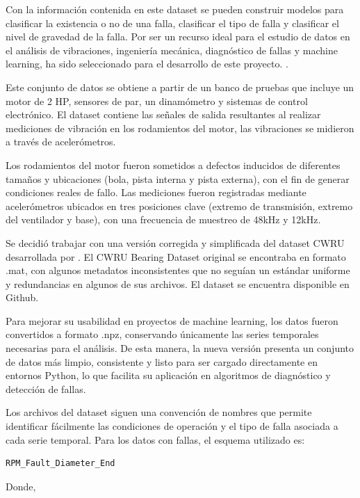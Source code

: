 \documentclass[11pt,a4paper,spanish]{book}
\numberwithin{equation}{chapter}
\numberwithin{figure}{chapter}
\begin{document}
Con la información contenida en este dataset se pueden construir modelos para clasificar la existencia o no de una falla, clasificar el tipo de falla y clasificar el nivel de gravedad de la falla. Por ser un recurso ideal para el estudio de datos en el análisis de vibraciones, ingeniería mecánica, diagnóstico de fallas y machine learning, ha sido seleccionado para el desarrollo de este proyecto. \cite{caseWesternBearingData}. 


Este conjunto de datos se obtiene a partir de un banco de pruebas que incluye un motor de 2 HP, sensores de par, un dinamómetro y sistemas de control electrónico. El dataset contiene las señales de salida resultantes al realizar mediciones de vibración en los rodamientos del motor, las vibraciones se midieron a través de acelerómetros.  


Los rodamientos del motor fueron sometidos a defectos inducidos de diferentes tamaños y ubicaciones (bola, pista interna y pista externa), con el fin de generar condiciones reales de fallo. Las mediciones fueron registradas mediante acelerómetros ubicados en tres posiciones clave (extremo de transmisión, extremo del ventilador y base), con una frecuencia de muestreo de 48kHz y 12kHz. 


Se decidió trabajar con una versión corregida y simplificada del dataset CWRU desarrollada por \cite{rigas2024marine}. El CWRU Bearing Dataset original se encontraba en formato .mat, con algunos metadatos inconsistentes que no seguían un estándar uniforme y redundancias en algunos de sus archivos. El dataset se encuentra disponible en Github. 


Para mejorar su usabilidad en proyectos de machine learning, los datos fueron convertidos a formato .npz, conservando únicamente las series temporales necesarias para el análisis. De esta manera, la nueva versión presenta un conjunto de datos más limpio, consistente y listo para ser cargado directamente en entornos Python, lo que facilita su aplicación en algoritmos de diagnóstico y detección de fallas.


Los archivos del dataset siguen una convención de nombres que permite identificar fácilmente las condiciones de operación y el tipo de falla asociada a cada serie temporal. Para los datos con fallas, el esquema utilizado es:


\begin{verbatim}
RPM_Fault_Diameter_End
\end{verbatim}


Donde, 
\end{document}
